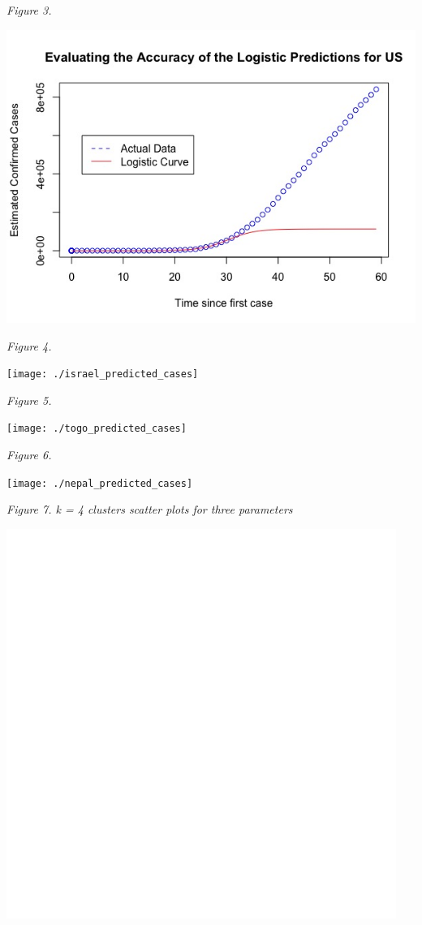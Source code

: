 \documentclass[]{article}
\begin{document}
\emph{Figure 3.}

\begin{center}\includegraphics{./us_predicted_cases} \end{center}

\emph{Figure 4.}

\begin{center}\texttt{[image: ./israel\_predicted\_cases]} \end{center}

\emph{Figure 5.}

\begin{center}\texttt{[image: ./togo\_predicted\_cases]} \end{center}

\emph{Figure 6.}

\begin{center}\texttt{[image: ./nepal\_predicted\_cases]} \end{center}

\emph{Figure 7. k = 4 clusters scatter plots for three parameters}

\begin{center}\includegraphics[width=0.5\linewidth]{./kmeans_plot} \end{center}
\end{document}
